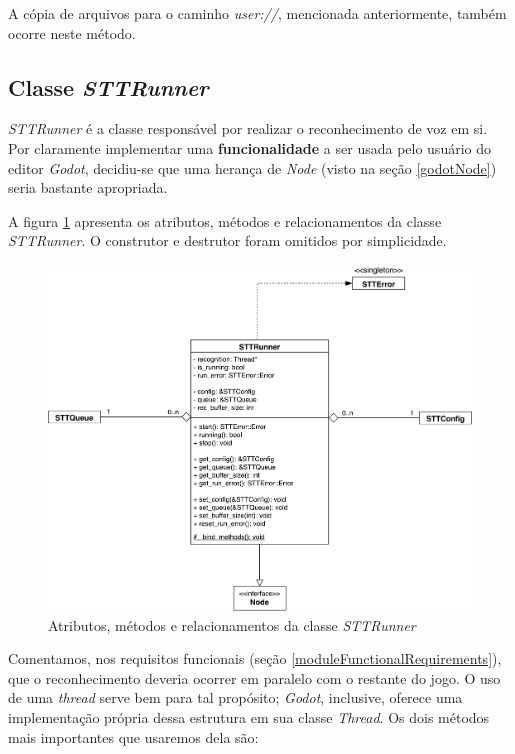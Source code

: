 A cópia de arquivos para o caminho \textit{user://}, mencionada anteriormente, também ocorre neste método.


\subsection{Classe \textit{STTRunner}}

\textit{STTRunner} é a classe responsável por realizar o reconhecimento de voz em si. Por claramente implementar uma \textbf{funcionalidade} a ser usada pelo usuário do editor \textit{Godot}, decidiu-se que uma herança de \textit{Node} (visto na seção \ref{godotNode}) seria bastante apropriada.

A figura \ref{stt-runner} apresenta os atributos, métodos e relacionamentos da classe \textit{STTRunner}. O construtor e destrutor foram omitidos por simplicidade.

\begin{figure}[H]
  \centering
  \includegraphics[width=.9\textwidth]{image/stt-runner.pdf}
  \caption{Atributos, métodos e relacionamentos da classe \textit{STTRunner}}
  \label{stt-runner}
\end{figure}

Comentamos, nos requisitos funcionais (seção \ref{moduleFunctionalRequirements}), que o reconhecimento deveria ocorrer em paralelo com o restante do jogo. O uso de uma \textit{thread} serve bem para tal propósito; \textit{Godot}, inclusive, oferece uma implementação própria dessa estrutura em sua classe \textit{Thread}. Os dois métodos mais importantes que usaremos dela são:

